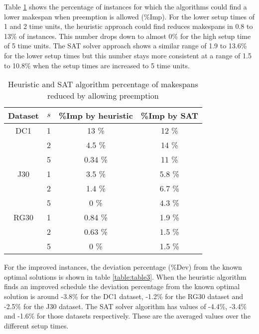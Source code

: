 Table \ref{table:table2} shows the percentage of instances for which the algorithms could find a lower makespan when preemption is allowed (\%Imp). For the lower setup times of 1 and 2 time units, the heuristic approach could find reduces makespans in 0.8 to 13\% of instances. This number drops down to almost 0\% for the high setup time of 5 time units. The SAT solver approach shows a similar range of 1.9 to 13.6\% for the lower setup times but this number stays more consistent at a range of 1.5 to 10.8\% when the setup times are increased to 5 time units.

\begin{table}
	\begin{center}
		\caption{Heuristic and SAT algorithm percentage of makespans reduced by allowing preemption}
		\label{table:table2}
		\begin{tabular}{ c | c c c }
			Dataset & \(s\) & \%Imp by heuristic & \%Imp by SAT \\
			\hline
			DC1  & 1 & 13 \% & 12 \% \\ 
			  & 2 & 4.5 \% & 14 \% \\  
			  & 5 & 0.34 \% & 11 \% \\ 
			J30  & 1 & 3.5 \% & 5.8 \% \\ 
			  & 2 & 1.4 \% & 6.7 \% \\  
			  & 5 & 0 \% & 4.3 \% \\ 
			RG30 & 1 & 0.84 \% & 1.9 \% \\ 
			 & 2 & 0.63 \% & 1.5 \% \\  
			 & 5 & 0 \% & 1.5 \%
		\end{tabular}
	\end{center}
\end{table}

For the improved instances, the deviation percentage (\%Dev) from the known optimal solutions is shown in table \ref{table:table3}. When the heuristic algorithm finds an improved schedule the deviation percentage from the known optimal solution is around -3.8\% for the DC1 dataset, -1.2\% for the RG30 dataset and -2.5\% for the J30 dataset. The SAT solver algorithm has values of -4.4\%, -3.4\% and -1.6\% for those datasets respectively. These are the averaged values over the different setup times.

